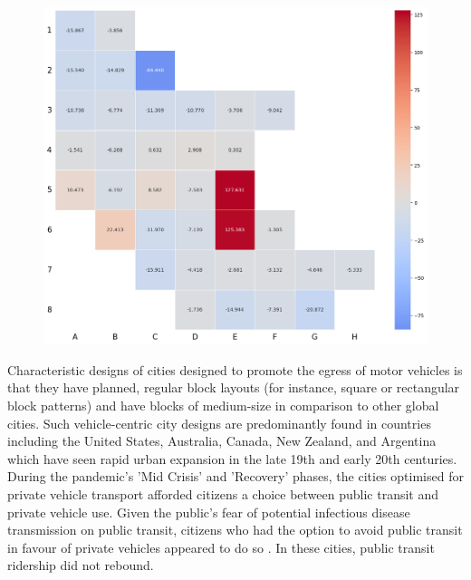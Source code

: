 \documentclass[preprint,12pt]{elsarticle}
\begin{document}
\begin{figure}
\centering
\includegraphics[trim={0 0 0 0},clip,scale=0.45]{Images/heatmap_no2Reduction7Ave7Ave250.png}
\caption{\bf }  
 \label{fig:Heatmap250NO2}
\end{figure}















Characteristic designs of cities designed to promote the egress of motor vehicles is that they have planned, regular block layouts (for instance, square or rectangular block patterns) and have blocks of medium-size in comparison to other global cities\cite{Thompson2020}. Such vehicle-centric city designs are predominantly found in countries including the United States, Australia, Canada, New Zealand, and Argentina which have seen rapid urban expansion in the late 19th and early 20th centuries. During the pandemic's 'Mid Crisis' and 'Recovery' phases, the cities optimised for private vehicle transport afforded citizens a choice between public transit and private vehicle use. Given the public's fear of potential infectious disease transmission on public transit\cite{fernando2023shaping}, citizens who had the option to avoid public transit in favour of private vehicles appeared to do so . In these cities, public transit ridership did not rebound. 
\end{document}
